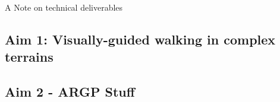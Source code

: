 A Note on technical deliverables

\subsection{Aim 1: Visually-guided walking in complex terrains}


\subsection{Aim 2 - ARGP Stuff}

